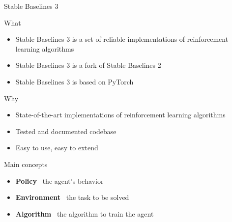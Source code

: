 \documentclass[presentation, 9pt]{beamer}\mode<presentation>{\usetheme{AMSBolognaFC}}
\begin{document}
\begin{frame}{Stable Baselines 3}
	\begin{block}{What}
		\begin{itemize}
			\item Stable Baselines 3 is a set of reliable implementations of reinforcement learning algorithms
			\item Stable Baselines 3 is a fork of Stable Baselines 2
			\item Stable Baselines 3 is based on PyTorch
		\end{itemize}
	\end{block}
	\begin{block}{Why}
		\begin{itemize}
			\item State-of-the-art implementations of reinforcement learning algorithms
			\item Tested and documented codebase
			\item Easy to use, easy to extend
		\end{itemize}
	\end{block}
	\begin{block}{Main concepts}
		\begin{itemize}
			\item \textbf{Policy} \faArrowRight \, the agent's behavior
			\item \textbf{Environment} \faArrowRight \, the task to be solved
			\item \textbf{Algorithm} \faArrowRight \, the algorithm to train the agent
		\end{itemize}
	\end{block}
\end{frame}
\end{document}
